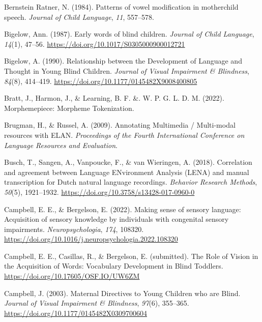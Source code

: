 \documentclass[
  man,floatsintext]{apa6}
\newlength{\cslhangindent}
\newlength{\cslentryspacingunit} %
\newenvironment{CSLReferences}[2] %
 {%
  \setlength{\parindent}{0pt}
  \ifodd #1
  \let\oldpar\par
  \def\par{\hangindent=\cslhangindent\oldpar}
  \fi
  \setlength{\parskip}{#2\cslentryspacingunit}
 }%
 {}
\begin{document}
\begin{CSLReferences}{1}{0}
\leavevmode{}%
Bernstein Ratner, N. (1984). Patterns of vowel modification in mother\textendash child speech. \emph{Journal of Child Language}, \emph{11}, 557--578.

\leavevmode{}%
Bigelow, Ann. (1987). Early words of blind children. \emph{Journal of Child Language}, \emph{14}(1), 47--56. \url{https://doi.org/10.1017/S0305000900012721}

\leavevmode{}%
Bigelow, A. (1990). Relationship between the {Development} of {Language} and {Thought} in {Young Blind Children}. \emph{Journal of Visual Impairment \& Blindness}, \emph{84}(8), 414--419. \url{https://doi.org/10.1177/0145482X9008400805}

\leavevmode{}%
Bratt, J., Harmon, J., \& Learning, B. F. \&. W. P. G. L. D. M. (2022). Morphemepiece: {Morpheme Tokenization}.

\leavevmode{}%
Brugman, H., \& Russel, A. (2009). Annotating {Multimedia} / {Multi-modal} resources with {ELAN}. \emph{Proceedings of the Fourth International Conference on Language Resources and Evaluation}.

\leavevmode{}%
Busch, T., Sangen, A., Vanpoucke, F., \& van Wieringen, A. (2018). Correlation and agreement between {Language ENvironment Analysis} ({LENA}\texttrademark ) and manual transcription for {Dutch} natural language recordings. \emph{Behavior Research Methods}, \emph{50}(5), 1921--1932. \url{https://doi.org/10.3758/s13428-017-0960-0}

\leavevmode{}%
Campbell, E. E., \& Bergelson, E. (2022). Making sense of sensory language: {Acquisition} of sensory knowledge by individuals with congenital sensory impairments. \emph{Neuropsychologia}, \emph{174}, 108320. \url{https://doi.org/10.1016/j.neuropsychologia.2022.108320}

\leavevmode{}%
Campbell, E. E., Casillas, R., \& Bergelson, E. (submitted). The {Role} of {Vision} in the {Acquisition} of {Words}: {Vocabulary Development} in {Blind Toddlers}. \url{https://doi.org/10.17605/OSF.IO/UW6ZM}

\leavevmode{}%
Campbell, J. (2003). Maternal {Directives} to {Young Children} who are {Blind}. \emph{Journal of Visual Impairment \& Blindness}, \emph{97}(6), 355--365. \url{https://doi.org/10.1177/0145482X0309700604}


\end{CSLReferences}
\end{document}
